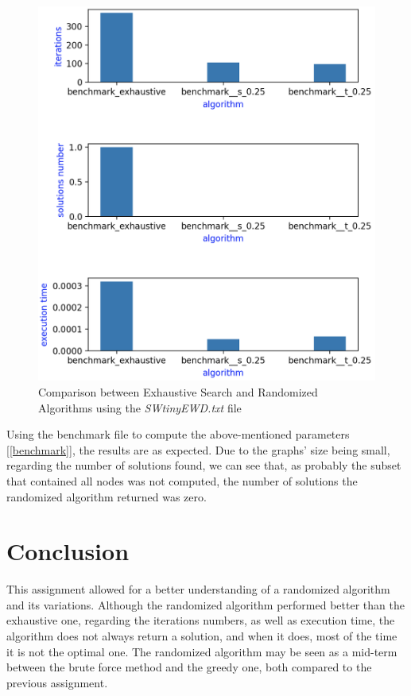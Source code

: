 \documentclass[...]{revdetua}
\begin{document}
\begin{figure}[!htbp]
    \centering
    \includegraphics[width=0.8\columnwidth]{./figures/benchmark.png}
    \caption{Comparison between Exhaustive Search and Randomized Algorithms using the \textit{SWtinyEWD.txt} file\label{benchmark}}
    \label{fig: Comparison between Exhaustive Search and Randomized Algorithms using the SWtinyEWD.txt file}
\end{figure}

Using the benchmark file to compute the above-mentioned parameters [\ref{benchmark}], the results are as expected. Due to the graphs' size being small, regarding the number of solutions found, we can see that, as probably the subset that contained all nodes was not computed, the number of solutions the randomized algorithm returned was zero.

\section{Conclusion}

This assignment allowed for a better understanding of a randomized algorithm and its variations. Although the randomized algorithm performed better than the exhaustive one, regarding the iterations numbers, as well as execution time, the algorithm does not always return a solution, and when it does, most of the time it is not the optimal one. The randomized algorithm may be seen as a mid-term between the brute force method and the greedy one, both compared to the previous assignment.
\end{document}
